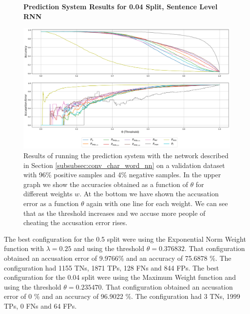 \begin{figure}
    \centering
    \textbf{Prediction System Results for 0.04 Split, Sentence Level RNN}\par\medskip
    \includegraphics[scale=0.35]{./pictures/experiments/conv_char_word_nn/prediction_system_04.png}
    \caption{Results of running the prediction system with the network described
        in Section \ref{subsubsec:conv_char_word_nn} on a validation dataset
        with 96\% positive samples and 4\% negative samples. In the upper graph
        we show the accuracies obtained as a function of $\theta$ for different
        weights $w$. At the bottom we have shown the accusation error as a
        function $\theta$ again with one line for each weight. We can see that
        as the threshold increases and we accuse more people of cheating the
        accusation error rises.}
    \label{fig:conv-char-word-NN-pred-4}
\end{figure}

The best configuration for the 0.5 split were using the Exponential Norm Weight
function with $\lambda = 0.25$ and using the threshold $\theta = 0.376832$.
That configuration obtained an accusation error of 9.9766\% and an accuracy of
75.6878 \%. The configuration had 1155 \gls{TN}s, 1871 \gls{TP}s, 128 \gls{FN}s
and 844 \gls{FP}s. The best configuration for the 0.04 split were using the
Maximum Weight function and using the threshold $\theta = 0.235470$. That
configuration obtained an accusation error of 0 \% and an accuracy of 96.9022
\%. The configuration had 3 \gls{TN}s, 1999 \gls{TP}s, 0 \gls{FN}s and 64
\gls{FP}s.


